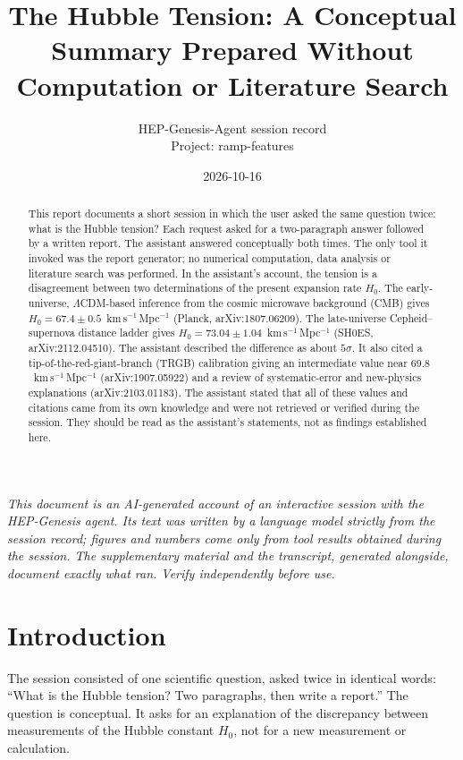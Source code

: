 \documentclass[11pt,a4paper]{article}
\title{The Hubble Tension: A Conceptual Summary Prepared Without Computation or Literature Search}
\author{HEP-Genesis-Agent session record \\ \small Project: ramp-features}
\date{2026-10-16}
\begin{document}
\maketitle
\noindent\textit{\small This document is an AI-generated account of an interactive session with the HEP-Genesis agent. Its text was written by a language model strictly from the session record; figures and numbers come only from tool results obtained during the session. The supplementary material and the transcript, generated alongside, document exactly what ran. Verify independently before use.}
\vspace{1em}

\begin{abstract}
This report documents a short session in which the user asked the same question twice: what is the Hubble tension? Each request asked for a two-paragraph answer followed by a written report. The assistant answered conceptually both times. The only tool it invoked was the report generator; no numerical computation, data analysis or literature search was performed. In the assistant's account, the tension is a disagreement between two determinations of the present expansion rate $H_0$. The early-universe, $\Lambda$CDM-based inference from the cosmic microwave background (CMB) gives $H_0 = 67.4 \pm 0.5$~km\,s$^{-1}$\,Mpc$^{-1}$ (Planck, arXiv:1807.06209). The late-universe Cepheid--supernova distance ladder gives $H_0 = 73.04 \pm 1.04$~km\,s$^{-1}$\,Mpc$^{-1}$ (SH0ES, arXiv:2112.04510). The assistant described the difference as about $5\sigma$. It also cited a tip-of-the-red-giant-branch (TRGB) calibration giving an intermediate value near $69.8$~km\,s$^{-1}$\,Mpc$^{-1}$ (arXiv:1907.05922) and a review of systematic-error and new-physics explanations (arXiv:2103.01183). The assistant stated that all of these values and citations came from its own knowledge and were not retrieved or verified during the session. They should be read as the assistant's statements, not as findings established here.
\end{abstract}

\section{Introduction}
The session consisted of one scientific question, asked twice in identical words: ``What is the Hubble tension? Two paragraphs, then write a report.'' The question is conceptual. It asks for an explanation of the discrepancy between measurements of the Hubble constant $H_0$, not for a new measurement or calculation.
\end{document}
